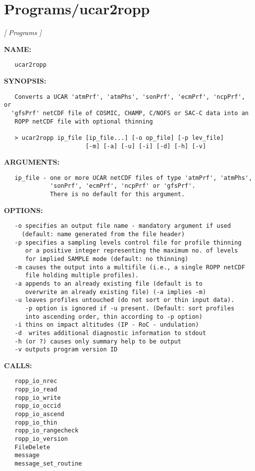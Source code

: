 \section{Programs/ucar2ropp}
\textsl{[ Programs ]}

\label{ch:robo90}
\label{ch:Programs_ucar2ropp}
\textbf{NAME:}\hspace{0.08in}\begin{Verbatim}
   ucar2ropp
\end{Verbatim}
\textbf{SYNOPSIS:}\hspace{0.08in}\begin{Verbatim}
   Converts a UCAR 'atmPrf', 'atmPhs', 'sonPrf', 'ecmPrf', 'ncpPrf', or
  'gfsPrf' netCDF file of COSMIC, CHAMP, C/NOFS or SAC-C data into an
   ROPP netCDF file with optional thinning

   > ucar2ropp ip_file [ip_file...] [-o op_file] [-p lev_file]
                       [-m] [-a] [-u] [-i] [-d] [-h] [-v]
\end{Verbatim}
\textbf{ARGUMENTS:}\hspace{0.08in}\begin{Verbatim}
   ip_file - one or more UCAR netCDF files of type 'atmPrf', 'atmPhs',
             'sonPrf', 'ecmPrf', 'ncpPrf' or 'gfsPrf'.
             There is no default for this argument.
\end{Verbatim}
\textbf{OPTIONS:}\hspace{0.08in}\begin{Verbatim}
   -o specifies an output file name - mandatory argument if used
     (default: name generated from the file header)
   -p specifies a sampling levels control file for profile thinning
      or a positive integer representing the maximum no. of levels
      for implied SAMPLE mode (default: no thinning)
   -m causes the output into a multifile (i.e., a single ROPP netCDF
      file holding multiple profiles).
   -a appends to an already existing file (default is to
      overwrite an already existing file) (-a implies -m)
   -u leaves profiles untouched (do not sort or thin input data).
      -p option is ignored if -u present. (Default: sort profiles
      into ascending order, thin according to -p option)
   -i thins on impact altitudes (IP - RoC - undulation)
   -d  writes additional diagnostic information to stdout
   -h (or ?) causes only summary help to be output
   -v outputs program version ID
\end{Verbatim}
\textbf{CALLS:}\hspace{0.08in}\begin{Verbatim}
   ropp_io_nrec
   ropp_io_read
   ropp_io_write
   ropp_io_occid
   ropp_io_ascend
   ropp_io_thin
   ropp_io_rangecheck
   ropp_io_version
   FileDelete
   message
   message_set_routine
\end{Verbatim}
